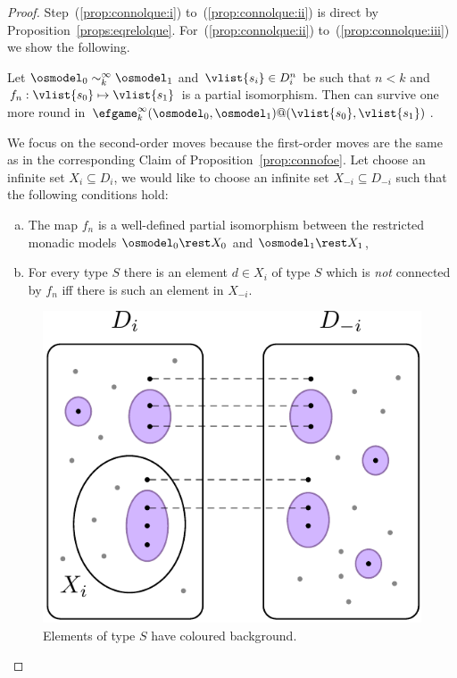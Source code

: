 \begin{proof}
Step~(\ref{prop:connolque:i}) to~(\ref{prop:connolque:ii}) is direct by 
Proposition~\ref{props:eqrelolque}. For~(\ref{prop:connolque:ii}) 
to~(\ref{prop:connolque:iii}) we show the following.

\begin{claimfirst}
Let $\osmodel_0 \sim_k^\infty \osmodel_1$ and $\vlist{s_i} \in D_i^n$ be such
that $n<k$ and $f_n:\vlist{s_0}\mapsto\vlist{s_1}$ is a partial isomorphism.
Then \eloise can survive one more round in $\efgame_{k}^\infty(\osmodel_0,
\osmodel_1)@(\vlist{s_0},\vlist{s_1})$.
\end{claimfirst}
\begin{pfclaim}
We focus on the second-order moves because the first-order moves are the same as
in the corresponding Claim of Proposition~\ref{prop:connofoe}. 
Let \abelard choose an infinite set $X_i \subseteq D_i$, we would like \eloise
to choose an infinite set $X_{-i} \subseteq D_{-i}$ such that the following 
conditions hold:

\begin{enumerate}[(a)]
\parskip 0pt
\item\label{it:piso} 
The map $f_n$ is a well-defined partial isomorphism between the restricted
monadic models $\osmodel_0{\rest}X_0$ and $\osmodel_1{\rest}X_1$,



\item\label{it:equiv}
For every type $S$ there is an element $d\in X_i$ of type $S$ which is 
\emph{not} connected by $f_n$ iff there is such an element in $X_{-i}$.
\end{enumerate}	
\begin{figure}[ht]
			\centering
			\includegraphics[scale=0.7]{figures/fig-efinf.pdf}
			\caption{Elements of type $S$ have coloured background.}
			\label{fig:efinf}
		\end{figure}


\end{pfclaim}
\end{proof}
